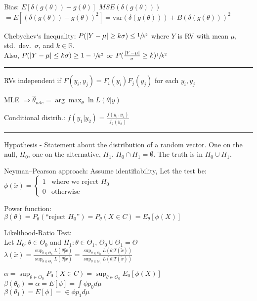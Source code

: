 \documentclass[notitlepage,10pt,twocolumn]{article}
\begin{document}
Bias: $E[\delta(g(\theta)) - g(\theta)]$
\quad \quad 
$MSE(\delta(g(\theta)))$ \\$ = E[(\delta(g(\theta))-g(\theta))^2]= \text{var}(\delta(g(\theta)))+B(\delta(g(\theta)))^2$

Chebychev`s Inequality: $P(|Y-\mu| \ge k\sigma) \le \sfrac{1}{k^2}$ where $Y$ is RV with mean $\mu$, std.\ dev.\ $\sigma$, and $k\in \mathbb{R}$.\\
	Also, $P(|Y-\mu|\le k\sigma) \ge 1- \sfrac{1}{k^2}$ or $P(\frac{|Y-\mu|}{\sigma}\ge k)\sfrac{1}{k^2}$

\vspace{.15cm} \hrule \vspace{.15cm}

RVs independent if $F(y_i,y_j) = F_i(y_i) F_j(y_j)$ for each $y_i, y_j$

MLE $\Rightarrow \hat{\theta}_{mle} = \arg \max_{\theta} \ln L(\theta|y)$

Conditional distrib.: $f(y_1|y_2) = \frac{f(y_1,y_2)}{f_2(y_2)}$

\vspace{.2cm} \hrule \vspace{.2cm}

Hypothesis - Statement about the distribution of a random vector. One on the null, $H_0$, one on the alternative, $H_1$. $H_0 \cap H_1 = \emptyset$. The truth is in $H_0 \cup H_1$.

Neyman--Pearson approach: Assume identifiability, Let the test be:\\
$\phi(\utilde{x}) = \begin{cases}
1&\text{where we reject $H_0$}\\
0&\text{otherwise}
\end{cases}$

Power function: \\$\beta(\theta) = P_\theta(\text{``reject $H_0$''}) = P_\theta(X\in C) = E_\theta[\phi(X)]$

Likelihood-Ratio Test:\\ Let $H_0:\theta \in \Theta_0$ and $H_1 : \theta \in \Theta_1$, $\Theta_0\cup\Theta_1 = \Theta$\\
$\lambda(\utilde{x}) = \frac{\sup_{\theta\in\Theta_0}L(\theta|\utilde{x})}{\sup_{\theta\in\Theta_1}L(\theta|\utilde{x})} = \frac{\sup_{\theta\in\Theta_0}L(\theta|T(\utilde{x}))}{\sup_{\theta\in\Theta_1}L(\theta|T(\utilde{x}))}$

$\alpha = \sup_{\theta\in\Theta_0}P_0(X\in C) = \sup_{\theta\in\Theta_0} E_0[\phi(X)]$\\
$\beta(\theta_0) = \alpha = E[\phi] = \int\phi p_0 d\mu$\\
$\beta(\theta_1) = E[\phi] = \in\phi p_1 d\mu$
\end{document}
